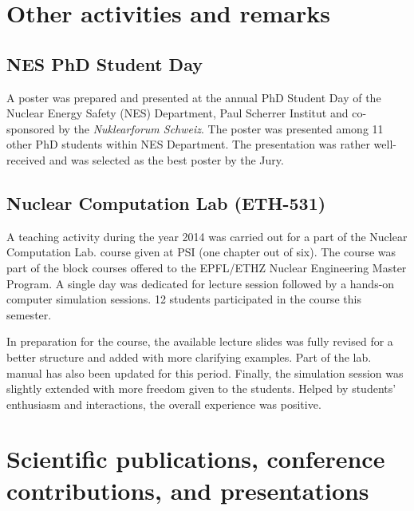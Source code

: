 \documentclass[11pt,titlepage]{article}
\begin{document}
\section{Other activities and remarks}

\subsection{NES PhD Student Day}

A poster was prepared and presented at the annual PhD Student Day of the 
Nuclear Energy Safety (NES) Department, Paul Scherrer Institut and co-sponsored 
by the \textit{Nuklearforum Schweiz}.
The poster \cite{Wicaksono2014b} was presented among 11 other PhD students 
within NES Department.
The presentation was rather well-received and was selected as the best 
poster by the Jury.


\subsection{Nuclear Computation Lab (ETH-531)}

A teaching activity during the year 2014 was carried out for a part of  
the Nuclear Computation Lab. course given at PSI (one chapter out of six).
The course was part of the block courses offered to the EPFL/ETHZ Nuclear
Engineering Master Program.
A single day was dedicated for lecture session followed by a hands-on 
computer simulation sessions.
12 students participated in the course this semester.

In preparation for the course, the available lecture slides was fully revised
for a better structure and added with more clarifying examples.
Part of the lab. manual has also been updated for this period.
Finally, the simulation session was slightly extended with more freedom given to
the students.
Helped by students' enthusiasm and interactions, the overall experience was 
positive.

\section{Scientific publications, conference contributions, and presentations}

\nocite{Wicaksono2014a}
\nocite{Wicaksono2014b}
\nocite{Wicaksono2014c}
\nocite{Wicaksono2014d}
\nocite{Wicaksono2014e}
\printbibliography[heading=none]
\end{document}
